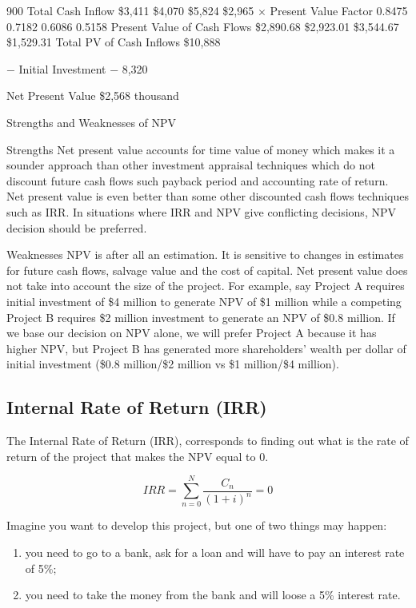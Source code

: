 \documentclass[]{book}
\providecommand{\tightlist}{%
  \setlength{\itemsep}{0pt}\setlength{\parskip}{0pt}}
\theoremstyle{definition}
\theoremstyle{definition}
\theoremstyle{definition}
\theoremstyle{remark}
\begin{document}
900 Total Cash Inflow \$3,411 \$4,070 \$5,824 \$2,965 × Present Value
Factor 0.8475 0.7182 0.6086 0.5158 Present Value of Cash Flows
\$2,890.68 \$2,923.01 \$3,544.67 \$1,529.31 Total PV of Cash Inflows
\$10,888

− Initial Investment − 8,320

Net Present Value \$2,568 thousand

Strengths and Weaknesses of NPV

Strengths Net present value accounts for time value of money which makes
it a sounder approach than other investment appraisal techniques which
do not discount future cash flows such payback period and accounting
rate of return. Net present value is even better than some other
discounted cash flows techniques such as IRR. In situations where IRR
and NPV give conflicting decisions, NPV decision should be preferred.

Weaknesses NPV is after all an estimation. It is sensitive to changes in
estimates for future cash flows, salvage value and the cost of capital.
Net present value does not take into account the size of the project.
For example, say Project A requires initial investment of \$4 million to
generate NPV of \$1 million while a competing Project B requires \$2
million investment to generate an NPV of \$0.8 million. If we base our
decision on NPV alone, we will prefer Project A because it has higher
NPV, but Project B has generated more shareholders' wealth per dollar of
initial investment (\$0.8 million/\$2 million vs \$1 million/\$4
million).

\subsection{Internal Rate of Return
(IRR)}\label{internal-rate-of-return-irr}

The Internal Rate of Return (IRR), corresponds to finding out what is
the rate of return of the project that makes the NPV equal to 0.

\[IRR=  \sum_{n=0}^{N}\frac{C_n}{(1+i)^n} = 0\]

Imagine you want to develop this project, but one of two things may
happen:

\begin{enumerate}
\def\labelenumi{\arabic{enumi})}
\tightlist
\item
  you need to go to a bank, ask for a loan and will have to pay an
  interest rate of 5\%;
\item
  you need to take the money from the bank and will loose a 5\% interest
  rate.
\end{enumerate}
\end{document}
